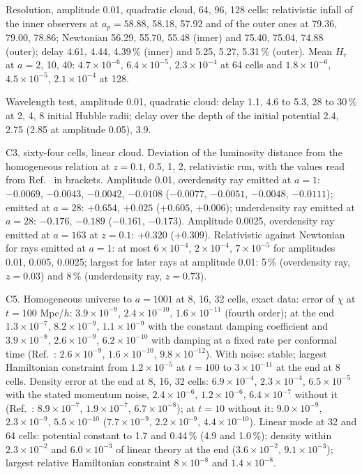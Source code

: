 \documentclass[aps,prd,twocolumn,10pt,superscriptaddress,nofootinbib,longbibliography,floatfix]{revtex4-2}
\begin{document}
Resolution, amplitude 0.01, quadratic cloud, 64, 96, 128 cells: relativistic infall of the inner observers at $a_p = 58.88$, 58.18, 57.92 and of the outer ones at 79.36, 79.00, 78.86; Newtonian 56.29, 55.70, 55.48 (inner) and 75.40, 75.04, 74.88 (outer); delay 4.61, 4.44, 4.39\,\% (inner) and 5.25, 5.27, 5.31\,\% (outer). Mean $H_r$ at $a = 2$, 10, 40: $4.7\times10^{-6}$, $6.4\times10^{-5}$, $2.3\times10^{-4}$ at 64 cells and $1.8\times10^{-6}$, $4.5\times10^{-5}$, $2.1\times10^{-4}$ at 128.

Wavelength test, amplitude 0.01, quadratic cloud: delay 1.1, 4.6 to 5.3, 28 to 30\,\% at 2, 4, 8 initial Hubble radii; delay over the depth of the initial potential 2.4, 2.75 (2.85 at amplitude 0.05), 3.9.

C3, sixty-four cells, linear cloud. Deviation of the luminosity distance from the homogeneous relation at $z = 0.1$, 0.5, 1, 2, relativistic run, with the values read from Ref.~\cite{East:2019chx} in brackets. Amplitude 0.01, overdensity ray emitted at $a = 1$: $-0.0069$, $-0.0043$, $-0.0042$, $-0.0108$ ($-0.0077$, $-0.0051$, $-0.0048$, $-0.0111$); emitted at $a = 28$: $+0.654$, $+0.025$ ($+0.605$, $+0.006$); underdensity ray emitted at $a = 28$: $-0.176$, $-0.189$ ($-0.161$, $-0.173$). Amplitude 0.0025, overdensity ray emitted at $a = 163$ at $z = 0.1$: $+0.320$ ($+0.309$). Relativistic against Newtonian for rays emitted at $a = 1$: at most $6\times10^{-4}$, $2\times10^{-4}$, $7\times10^{-5}$ for amplitudes 0.01, 0.005, 0.0025; largest for later rays at amplitude 0.01: 5\,\% (overdensity ray, $z = 0.03$) and 8\,\% (underdensity ray, $z = 0.73$).

C5. Homogeneous universe to $a = 1001$ at 8, 16, 32 cells, exact data: error of $\chi$ at $t = 100$ Mpc/$h$: $3.9\times10^{-9}$, $2.4\times10^{-10}$, $1.6\times10^{-11}$ (fourth order); at the end $1.3\times10^{-7}$, $8.2\times10^{-9}$, $1.1\times10^{-9}$ with the constant damping coefficient and $3.9\times10^{-8}$, $2.6\times10^{-9}$, $6.2\times10^{-10}$ with damping at a fixed rate per conformal time (Ref.~\cite{Daverio:2019gql}: $2.6\times10^{-9}$, $1.6\times10^{-10}$, $9.8\times10^{-12}$). With noise: stable; largest Hamiltonian constraint from $1.2\times10^{-5}$ at $t = 100$ to $3\times10^{-11}$ at the end at 8 cells. Density error at the end at 8, 16, 32 cells: $6.9\times10^{-4}$, $2.3\times10^{-4}$, $6.5\times10^{-5}$ with the stated momentum noise, $2.4\times10^{-6}$, $1.2\times10^{-6}$, $6.4\times10^{-7}$ without it (Ref.~\cite{Daverio:2019gql}: $8.9\times10^{-7}$, $1.9\times10^{-7}$, $6.7\times10^{-8}$); at $t = 10$ without it: $9.0\times10^{-9}$, $2.3\times10^{-9}$, $5.5\times10^{-10}$ ($7.7\times10^{-9}$, $2.2\times10^{-9}$, $4.4\times10^{-10}$). Linear mode at 32 and 64 cells: potential constant to 1.7 and 0.44\,\% (4.9 and 1.0\,\%); density within $2.3\times10^{-2}$ and $6.0\times10^{-3}$ of linear theory at the end ($3.6\times10^{-2}$, $9.1\times10^{-3}$); largest relative Hamiltonian constraint $8\times10^{-8}$ and $1.4\times10^{-8}$.
\end{document}
